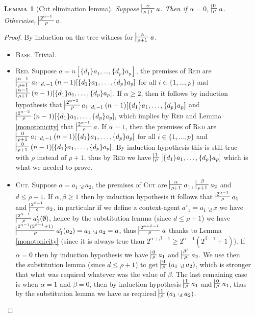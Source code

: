 \documentclass{article}
\newtheorem{lemma}{\textsc{Lemma}}
\begin{document}
\begin{lemma}[Cut elimination lemma]
Suppose $\sststile{\rho+1}{\alpha} a$. Then if $\alpha = 0$, $\sststile{\rho}{0} a$. Otherwise, $\sststile{\rho}{2^{\alpha-1}} a$.
\end{lemma}
\begin{proof}
By induction on the tree witness for $\sststile{\rho+1}{\alpha} a$.
\begin{itemize}
\item \textsc{Base.} Trivial.
\item \textsc{Red.} Suppose $a=n[\{d_1\}a_1, \dots, \{d_p\}a_p]$, the premises of \textsc{Red} are
$\sststile{\rho + 1}{\alpha-1} a_i \cdot_{d_i - 1} (n-1)[\{d_1\}a_1, \dots, \{d_p\}a_p]$ for all $i\in \{1, \dots, p\}$ and $\sststile{\rho+1}{\alpha-1} (n-1)[\{d_1\}a_1, \dots, \{d_p\}a_p]$.
If $\alpha \geq 2$, then it follows by induction hypothesis that $\sststile{\rho}{2^{\alpha-2}} a_i \cdot_{d_i - 1} (n-1)[\{d_1\}a_1, \dots, \{d_p\}a_p]$ and
$\sststile{\rho}{2^{\alpha-2}}(n-1)[\{d_1\}a_1, \dots, \{d_p\}a_p]$, which implies by \textsc{Red} and Lemma \ref{monotonicity} that $\sststile{\rho}{2^{\alpha-1}} a$. If $\alpha = 1$, then
the premises of \textsc{Red} are $\sststile{\rho + 1}{0} a_i \cdot_{d_i - 1} (n-1)[\{d_1\}a_1, \dots, \{d_p\}a_p]$ for all $i\in \{1, \dots, p\}$ and $\sststile{\rho+1}{0} (n-1)[\{d_1\}a_1, \dots, \{d_p\}a_p]$. By induction
hypothesis this is still true with $\rho$ instead of $\rho+1$, thus by \textsc{Red} we have $\sststile{\rho}{1} [\{d_1\}a_1, \dots, \{d_p\}a_p]$ which is what we needed to prove.
\item \textsc{Cut.} Suppose $a= a_1 \cdot_d a_2$, the premises of \textsc{Cut} are $\sststile{\rho+1}{\alpha} a_1$, $\sststile{\rho+1}{\beta} a_2$ and $d\leq \rho+1$. If $\alpha, \beta \geq 1$
then by induction hypothesis it follows that $\sststile{\rho}{2^{\alpha-1}} a_1$ and $\sststile{\rho}{2^{\beta-1}} a_2$, in particular if we define a context-agent $a'_1 = a_1 \cdot_d x$ we have
$\sststile{\rho}{2^{\alpha-1}} a'_1(\emptyset)$, hence by the substitution lemma (since $d\leq \rho+1$) we have
$\sststile{\rho}{2^{\alpha-1} (2^{\beta-1}+1)} a'_1(a_2) = a_1 \cdot_d a_2 = a$, thus $\sststile{\rho}{2^{\alpha+\beta-1}} a$ thanks to Lemma \ref{monotonicity} (since it is always true
than $2^{\alpha+\beta-1} \geq 2^{\alpha-1} (2^{\beta-1}+1)$).
If $\alpha = 0$ then by induction hypothesis we have $\sststile{\rho}{0} a_1$ and $\sststile{\rho}{\beta'} a_2$. We use then the substitution lemma (since $d\leq \rho+1$) to get $\sststile{\rho}{0}(a_1 \cdot_d a_2)$, which
is stronger that what was required whatever was the value of $\beta$. The last remaining case is when $\alpha=1$ and $\beta=0$, then by induction hypothesis $\sststile{\rho}{1} a_1$ and $\sststile{\rho}{0} a_1$,
thus by the substitution lemma we have as required $\sststile{\rho}{1}(a_1 \cdot_d a_2)$.
\end{itemize}
\end{proof}
\end{document}
